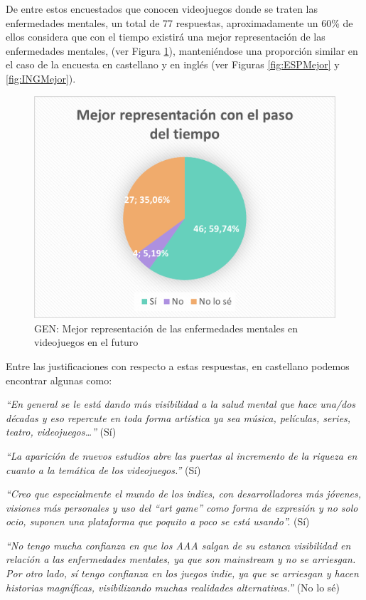\documentclass[12pt, a4paper,twoside,titlepage]{book}
\begin{document}
De entre estos encuestados que conocen videojuegos donde se traten las enfermedades mentales, un total de 77 respuestas, aproximadamente un 60\% de ellos considera que con el tiempo existirá una mejor representación de las enfermedades mentales, (ver Figura \ref{fig:Mejor}), manteniéndose una proporción similar en el caso de la encuesta en castellano y en inglés (ver Figuras \ref{fig:ESPMejor} y \ref{fig:INGMejor}). 

\begin{figure}
\centering
 \includegraphics[width=.8\linewidth]{Imagenes Form GEN/12GENMejor}
 \caption{GEN: Mejor representación de las enfermedades mentales en videojuegos en el futuro}
 \label{fig:Mejor}
 \end{figure}

Entre las justificaciones con respecto a estas respuestas, en castellano podemos encontrar algunas como: 

\textit{``En general se le está dando más visibilidad a la salud mental que hace una/dos décadas y eso repercute en toda forma artística ya sea música, películas, series, teatro, videojuegos…''} (Sí)

\textit{``La aparición de nuevos estudios abre las puertas al incremento de la riqueza en cuanto a la temática de los videojuegos.''} (Sí)

\textit{``Creo que especialmente el mundo de los indies, con desarrolladores más jóvenes, visiones más personales y uso del ``art game'' como forma de expresión y no solo ocio, suponen una plataforma que poquito a poco se está usando''.} (Sí)

\textit{``No tengo mucha confianza en que los AAA salgan de su estanca visibilidad en relación a las enfermedades mentales, ya que son mainstream y no se arriesgan. Por otro lado, sí tengo confianza en los juegos indie, ya que se arriesgan y hacen historias magníficas, visibilizando muchas realidades alternativas.''} (No lo sé) 
\end{document}
